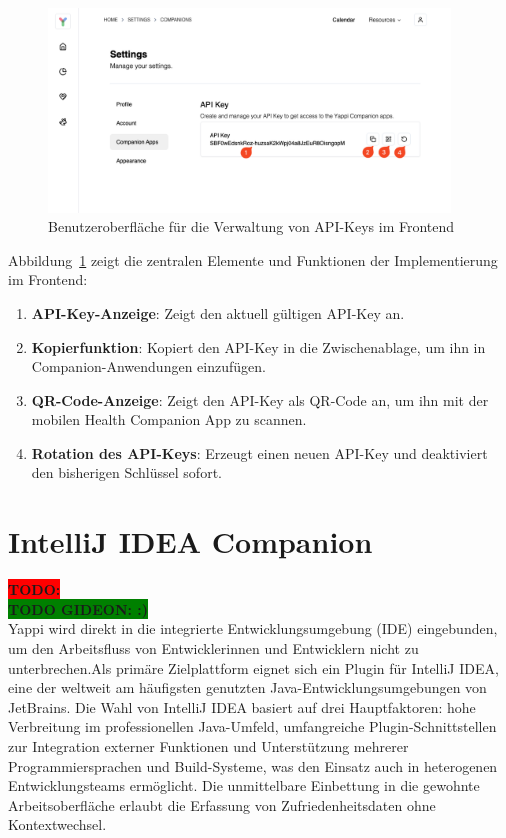 \documentclass[12pt,a4paper]{report}
\newcommand{\todo}[1]{\colorbox{red}{\textbf{TODO: #1}}\\}
\newcommand{\gideon}[1]{\colorbox{green}{\textbf{TODO GIDEON: #1}}\\}
\begin{document}
\begin{figure}[H]
  \centering
  \includegraphics[width=0.95\textwidth]{../figures/yappi-settings-apikey.jpg}
  \caption{Benutzeroberfläche für die Verwaltung von API-Keys im Frontend}
  \label{fig:apikey-frontend}
\end{figure}

Abbildung~\ref{fig:apikey-frontend} zeigt die zentralen Elemente und Funktionen der Implementierung im Frontend:

\begin{enumerate}
  \item \textbf{API-Key-Anzeige}: Zeigt den aktuell gültigen API-Key an.
  \item \textbf{Kopierfunktion}: Kopiert den API-Key in die Zwischenablage, um ihn in Companion-Anwendungen einzufügen.
  \item \textbf{QR-Code-Anzeige}: Zeigt den API-Key als QR-Code an, um ihn mit der mobilen Health Companion App zu scannen.
  \item \textbf{Rotation des API-Keys}: Erzeugt einen neuen API-Key und deaktiviert den bisherigen Schlüssel sofort.
\end{enumerate}


\section{IntelliJ IDEA Companion}

\todo{}

\gideon{:)}

Yappi wird direkt in die integrierte Entwicklungsumgebung (IDE) eingebunden, um den Arbeitsfluss von Entwicklerinnen
und Entwicklern nicht zu unterbrechen.Als primäre Zielplattform eignet sich ein Plugin für IntelliJ IDEA,
eine der weltweit am häufigsten genutzten Java-Entwicklungsumgebungen von JetBrains.
Die Wahl von IntelliJ IDEA basiert auf drei Hauptfaktoren: hohe Verbreitung im professionellen Java-Umfeld,
umfangreiche Plugin-Schnittstellen zur Integration externer Funktionen und Unterstützung mehrerer Programmiersprachen
und Build-Systeme, was den Einsatz auch in heterogenen Entwicklungsteams ermöglicht.
Die unmittelbare Einbettung in die gewohnte Arbeitsoberfläche erlaubt die Erfassung von Zufriedenheitsdaten ohne Kontextwechsel.
\end{document}
